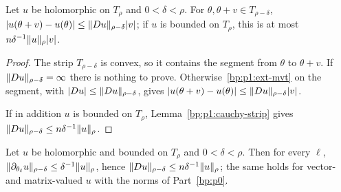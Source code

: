 \begin{lemma}[Increments]\label{bp:p1:increments}
Let $u$ be holomorphic on $T_\rho$ and $0<\delta<\rho$. For $\theta,\theta+v\in T_{\rho-\delta}$,
$\lvert u(\theta+v)-u(\theta)\rvert\le\lVert Du\rVert_{\rho-\delta}\lvert v\rvert$; if $u$ is bounded on $T_\rho$, this is at most
$n\delta^{-1}\lVert u\rVert_\rho\lvert v\rvert$.
\end{lemma}

\begin{proof}
\label{step:p1:inc-mvt}
The strip $T_{\rho-\delta}$ is convex, so it contains the segment from $\theta$ to $\theta+v$. If $\lVert Du\rVert_{\rho-\delta}=\infty$ there is nothing to prove.
Otherwise~\ref{bp:p1:ext-mvt} on the segment, with $\lvert Du\rvert\le\lVert Du\rVert_{\rho-\delta}$, gives
$\lvert u(\theta+v)-u(\theta)\rvert\le\lVert Du\rVert_{\rho-\delta}\lvert v\rvert$.

\label{step:p1:inc-cauchy}
If in addition $u$ is bounded on $T_\rho$, Lemma~\ref{bp:p1:cauchy-strip} gives
$\lVert Du\rVert_{\rho-\delta}\le n\delta^{-1}\lVert u\rVert_\rho$.
\end{proof}

\begin{lemma}\label{bp:p1:cauchy-strip}
Let $u$ be holomorphic and bounded on $T_\rho$ and $0<\delta<\rho$. Then for every $\ell$,
$\lVert \partial_{\theta_\ell}u\rVert_{\rho-\delta}\le\delta^{-1}\lVert u\rVert_\rho$, hence
$\lVert Du\rVert_{\rho-\delta}\le n\delta^{-1}\lVert u\rVert_\rho$; the same holds for vector- and matrix-valued
$u$ with the norms of Part~\ref{bp:p0}.
\end{lemma}

